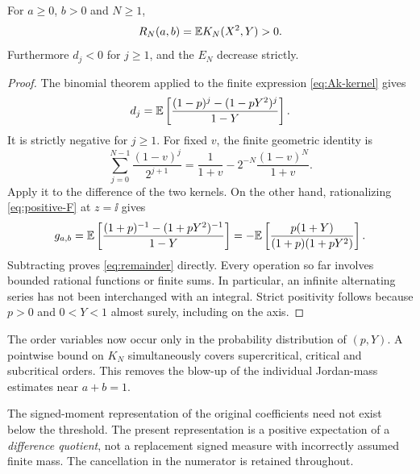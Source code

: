 \begin{proposition}\label{prop:remainder}
For $a\ge0$, $b>0$ and $N\ge1$,
\begin{equation}\label{eq:remainder}
 R_N(a,b)=\mathbb E K_N(X^2,Y)>0.
\end{equation}
Furthermore $d_j<0$ for $j\ge1$, and the $E_N$ decrease strictly.
\end{proposition}
\begin{proof}
The binomial theorem applied to the finite expression \eqref{eq:Ak-kernel} gives
\[
 d_j=\mathbb E\left[\frac{(1-p)^j-(1-pY^2)^j}{1-Y}\right].
\]
It is strictly negative for $j\ge1$. For fixed $v$, the finite geometric identity is
\[
 \sum_{j=0}^{N-1}\frac{(1-v)^j}{2^{j+1}}
 =\frac{1}{1+v}-2^{-N}\frac{(1-v)^N}{1+v}.
\]
Apply it to the difference of the two kernels. On the other hand, rationalizing \eqref{eq:positive-F} at $z=\ii$ gives
\begin{equation}\label{eq:g-kernel}
 g_{a,b}
 =\mathbb E\left[\frac{(1+p)^{-1}-(1+pY^2)^{-1}}{1-Y}\right]
 =-\mathbb E\left[\frac{p(1+Y)}{(1+p)(1+pY^2)}\right].
\end{equation}
Subtracting proves \eqref{eq:remainder} directly. Every operation so far involves bounded rational functions or finite sums. In particular, an infinite alternating series has not been interchanged with an integral. Strict positivity follows because $p>0$ and $0<Y<1$ almost surely, including on the axis.
\end{proof}

The order variables now occur only in the probability distribution of $(p,Y)$. A pointwise bound on $K_N$ simultaneously covers supercritical, critical and subcritical orders. This removes the blow-up of the individual Jordan-mass estimates near $a+b=1$.

\begin{remark}
The signed-moment representation of the original coefficients need not exist below the threshold. The present representation is a positive expectation of a \emph{difference quotient}, not a replacement signed measure with incorrectly assumed finite mass. The cancellation in the numerator is retained throughout.
\end{remark}
